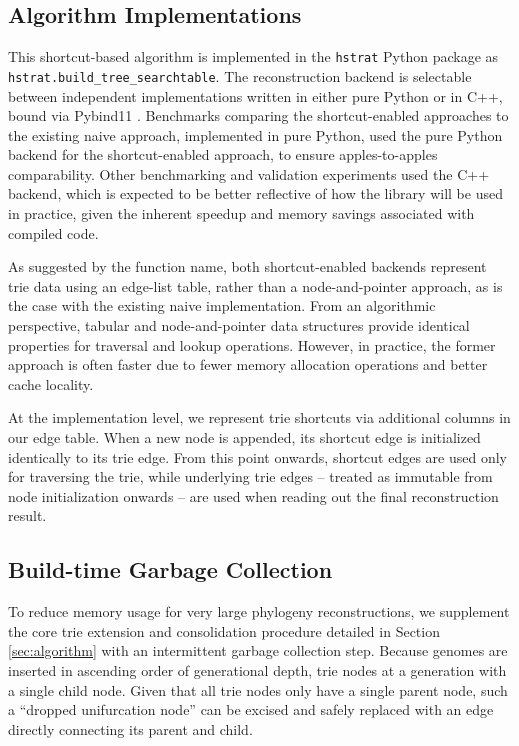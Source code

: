 \subsection{Algorithm Implementations}

This shortcut-based algorithm is implemented in the \texttt{hstrat} Python package \citep{moreno2022hstrat} as \texttt{hstrat.build\_tree\_searchtable}.
The reconstruction backend is selectable between independent implementations written in either pure Python or in C++, bound via Pybind11 \citep{pybind11}.
Benchmarks comparing the shortcut-enabled approaches to the existing naive approach, implemented in pure Python, used the pure Python backend for the shortcut-enabled approach, to ensure apples-to-apples comparability.
Other benchmarking and validation experiments used the C++ backend, which is expected to be better reflective of how the library will be used in practice, given the inherent speedup and memory savings associated with compiled code.

As suggested by the function name, both shortcut-enabled backends represent trie data using an edge-list table, rather than a node-and-pointer approach, as is the case with the existing naive implementation.
From an algorithmic perspective, tabular and node-and-pointer data structures provide identical properties for traversal and lookup operations.
However, in practice, the former approach is often faster due to fewer memory allocation operations and better cache locality.

At the implementation level, we represent trie shortcuts via additional columns in our edge table.
When a new node is appended, its shortcut edge is initialized identically to its trie edge.
From this point onwards, shortcut edges are used only for traversing the trie, while underlying trie edges -- treated as immutable from node initialization onwards -- are used when reading out the final reconstruction result.

\subsection{Build-time Garbage Collection}

To reduce memory usage for very large phylogeny reconstructions, we supplement the core trie extension and consolidation procedure detailed in Section \ref{sec:algorithm} with an intermittent garbage collection step.
Because genomes are inserted in ascending order of generational depth, trie nodes at a generation with a single child node.
Given that all trie nodes only have a single parent node, such a ``dropped unifurcation node'' can be excised and safely replaced with an edge directly connecting its parent and child.


